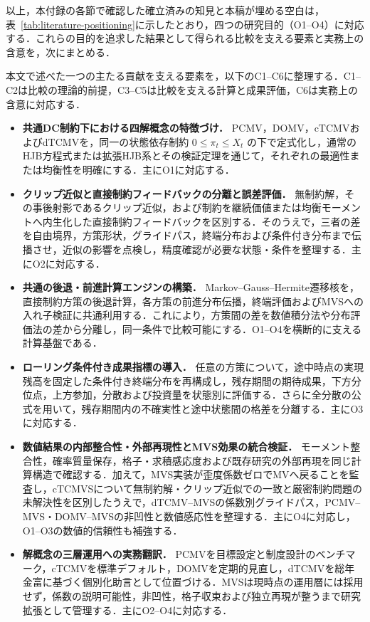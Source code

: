 \documentclass[10pt,a4paper]{article}
\theoremstyle{plain}
\theoremstyle{definition}
\begin{document}
以上，本付録の各節で確認した確立済みの知見と本稿が埋める空白は，表~\ref{tab:literature-positioning}に示したとおり，四つの研究目的（O1--O4）に対応する．これらの目的を追求した結果として得られる比較を支える要素と実務上の含意を，次にまとめる．

本文で述べた一つの主たる貢献を支える要素を，以下のC1--C6に整理する．C1--C2は比較の理論的前提，C3--C5は比較を支える計算と成果評価，C6は実務上の含意に対応する．

\begin{itemize}[leftmargin=16mm,itemsep=4pt,topsep=4pt]
  \item[\textbf{C1}] \textbf{共通DC制約下における四解概念の特徴づけ．}
  PCMV，DOMV，cTCMVおよびdTCMVを，同一の状態依存制約 $0\leq\pi_t\leq X_t$ の下で定式化し，通常のHJB方程式または拡張HJB系とその検証定理を通じて，それぞれの最適性または均衡性を明確にする．主にO1に対応する．

  \item[\textbf{C2}] \textbf{クリップ近似と直接制約フィードバックの分離と誤差評価．}
  無制約解，その事後射影であるクリップ近似，および制約を継続価値または均衡モーメントへ内生化した直接制約フィードバックを区別する．そのうえで，三者の差を自由境界，方策形状，グライドパス，終端分布および条件付き分布まで伝播させ，近似の影響を点検し，精度確認が必要な状態・条件を整理する．主にO2に対応する．

  \item[\textbf{C3}] \textbf{共通の後退・前進計算エンジンの構築．}
  Markov--Gauss--Hermite遷移核を，直接制約方策の後退計算，各方策の前進分布伝播，終端評価およびMVSへの入れ子検証に共通利用する．これにより，方策間の差を数値積分法や分布評価法の差から分離し，同一条件で比較可能にする．O1--O4を横断的に支える計算基盤である．

  \item[\textbf{C4}] \textbf{ローリング条件付き成果指標の導入．}
  任意の方策について，途中時点の実現残高を固定した条件付き終端分布を再構成し，残存期間の期待成果，下方分位点，上方参加，分散および投資量を状態別に評価する．さらに全分散の公式を用いて，残存期間内の不確実性と途中状態間の格差を分離する．主にO3に対応する．

  \item[\textbf{C5}] \textbf{数値結果の内部整合性・外部再現性とMVS効果の統合検証．}
  モーメント整合性，確率質量保存，格子・求積感応度および既存研究の外部再現を同じ計算構造で確認する．加えて，MVS実装が歪度係数ゼロでMVへ戻ることを監査し，cTCMVSについて無制約解・クリップ近似での一致と厳密制約問題の未解決性を区別したうえで，dTCMV--MVSの係数別グライドパス，PCMV--MVS・DOMV--MVSの非凹性と数値感応性を整理する．主にO4に対応し，O1--O3の数値的信頼性も補強する．

  \item[\textbf{C6}] \textbf{解概念の三層運用への実務翻訳．}
  PCMVを目標設定と制度設計のベンチマーク，cTCMVを標準デフォルト，DOMVを定期的見直し，dTCMVを総年金富に基づく個別化助言として位置づける．MVSは現時点の運用層には採用せず，係数の説明可能性，非凹性，格子収束および独立再現が整うまで研究拡張として管理する．主にO2--O4に対応する．
\end{itemize}
\end{document}
